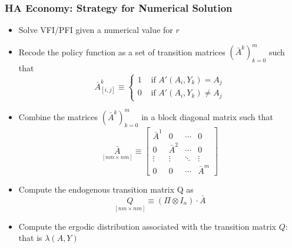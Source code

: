 \documentclass[10pt, aspectratio=1610, natbib, handout]{beamer}
\begin{document}
  \begin{frame}
    \frametitle{HA Economy: Strategy for Numerical Solution}

    \begin{itemize}
      \item Solve VFI/PFI given a numerical value for $r$
      \item Recode the policy function as a set of transition matrices ${(\bar{A}^k)}_{k=0}^{m}$ such that
        \begin{equation*}
          \bar{A}^k_{[i, j]} \equiv
          \begin{cases}
            1 & \text{ if } A'(A_i, Y_k) = A_j \\
            0 & \text{ if } A'(A_i, Y_k) \neq A_j
          \end{cases}
        \end{equation*}
      \item Combine the matrices ${(\bar{A}^k)}_{k=0}^{m}$ in a block diagonal matrix such that
        \begin{equation*}
          \underset{[n m \times n m]}{\bar{A}} \equiv
          \begin{bmatrix}
            \bar{A}^1 & 0 & \cdots & 0 \\
            0 & \bar{A}^2 & \cdots & 0 \\
            \vdots & \vdots & \ddots & \vdots \\
            0 & 0 & \cdots & \bar{A}^{m}
          \end{bmatrix}
        \end{equation*}
      \item Compute the endogenous transition matrix Q as \hfill{}
        \begin{equation*}
          \underset{[n m \times n m]}{Q} \equiv (\Pi \otimes I_n) \cdot \bar{A}
        \end{equation*}
      \item Compute the ergodic distribution associated with the transition matrix $Q$: that is $\lambda(A, Y)$
    \end{itemize}

  \end{frame}
\end{document}
